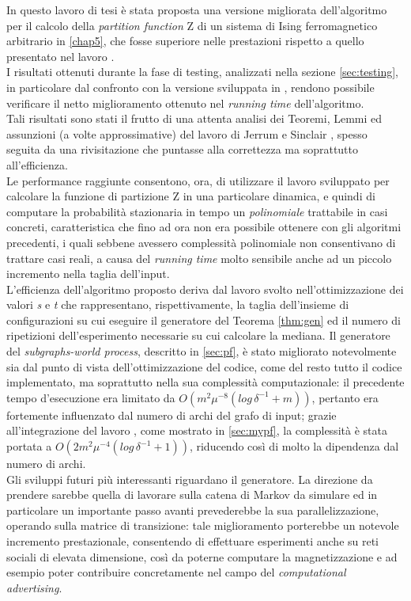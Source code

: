 In questo lavoro di tesi è stata proposta una versione migliorata dell'algoritmo per il calcolo della \textit{partition function} Z di un sistema di Ising ferromagnetico arbitrario in \ref{chap5}, che fosse superiore nelle prestazioni rispetto a quello presentato nel lavoro \cite{rinaldi2016approximation}.\\
I risultati ottenuti durante la fase di testing, analizzati nella sezione \ref{sec:testing}, in particolare dal confronto con la versione sviluppata in \cite{rinaldi2016approximation}, rendono possibile verificare il netto miglioramento ottenuto nel \textit{running time} dell'algoritmo.\\
Tali risultati sono stati il frutto di una attenta analisi dei Teoremi, Lemmi ed assunzioni (a volte approssimative) del lavoro di Jerrum e Sinclair \cite{jerrum1993polynomial}, spesso seguita da una rivisitazione che puntasse alla correttezza ma soprattutto all'efficienza.\\
Le performance raggiunte consentono, ora, di utilizzare il lavoro sviluppato per calcolare la funzione di partizione Z in una particolare dinamica, e quindi di computare la probabilità stazionaria in tempo un \textit{polinomiale} trattabile in casi concreti, caratteristica che fino ad ora non era possibile ottenere con gli algoritmi precedenti, i quali sebbene avessero complessità polinomiale non consentivano di trattare casi reali, a causa del \textit{running time} molto sensibile anche ad un piccolo incremento nella taglia dell'input.\\
L'efficienza dell'algoritmo proposto deriva dal lavoro svolto nell'ottimizzazione dei valori \textit{s} e \textit{t} che rappresentano, rispettivamente, la taglia dell'insieme di configurazioni su cui eseguire il generatore del Teorema \ref{thm:gen} ed il numero di ripetizioni dell'esperimento necessarie su cui calcolare la mediana. Il generatore del \textit{subgraphs-world process}, descritto in \ref{sec:pf}, è stato migliorato notevolmente sia dal punto di vista dell'ottimizzazione del codice, come del resto tutto il codice implementato, ma soprattutto nella sua complessità computazionale: il precedente tempo d'esecuzione era limitato da $O(m^2\mu^{-8}(log\,\delta^{-1} + m))$, pertanto era fortemente influenzato dal numero di archi del grafo di input; grazie all'integrazione del lavoro \cite{auletta2011convergence}, come mostrato in \ref{sec:mypf}, la complessità è stata portata a $O(2m^2\mu^{-4}(log\,\delta^{-1} + 1))$, riducendo così di molto la dipendenza dal numero di archi.\\
Gli sviluppi futuri più interessanti riguardano il generatore. La direzione da prendere sarebbe quella di lavorare sulla catena di Markov da simulare ed in particolare un importante passo avanti prevederebbe la sua parallelizzazione, operando sulla matrice di transizione: tale miglioramento porterebbe un notevole incremento prestazionale, consentendo di effettuare esperimenti anche su reti sociali di elevata dimensione, così da poterne computare la magnetizzazione e ad esempio poter contribuire concretamente nel campo del \textit{computational advertising}.